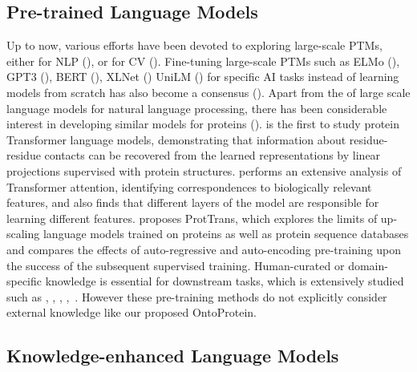 \subsection{Pre-trained Language Models}
Up to now, various efforts have been devoted to exploring large-scale PTMs, either for NLP (\cite{DBLP:conf/naacl/PetersNIGCLZ18,DBLP:conf/naacl/DevlinCLT19}), or for CV (\cite{DBLP:conf/emnlp/TanB19}).
Fine-tuning large-scale PTMs such as ELMo (\cite{DBLP:conf/naacl/PetersNIGCLZ18}), GPT3 (\cite{DBLP:conf/nips/BrownMRSKDNSSAA20}), BERT (\cite{DBLP:conf/naacl/DevlinCLT19}), XLNet (\cite{DBLP:conf/nips/YangDYCSL19}) UniLM (\cite{DBLP:conf/nips/00040WWLWGZH19}) for specific AI tasks instead of learning models from scratch has also become a consensus (\cite{DBLP:journals/corr/abs-2106-07139}). 
Apart from the of large scale language models for natural language processing, there has been considerable interest in developing similar models for proteins (\cite{DBLP:journals/corr/abs-2108-07435,DBLP:journals/pnas/RivesMSGLLGOZMF21}).
\cite{DBLP:conf/icml/RaoLVMCASR21} is the first to study protein Transformer language models, demonstrating that information about residue-residue contacts can be recovered from the learned representations by linear projections supervised with protein structures. 
\cite{DBLP:conf/iclr/VigMVXSR21} performs an extensive analysis of Transformer attention, identifying correspondences to biologically relevant features, and also finds that different layers of the model are responsible for learning different features. 
\cite{DBLP:journals/corr/abs-2007-06225} proposes ProtTrans, which explores the limits of up-scaling language models trained on proteins as well as protein sequence databases and compares the effects of auto-regressive and auto-encoding pre-training upon the success of the subsequent supervised training. 
Human-curated or domain-specific knowledge is essential for downstream tasks, {\color{highlight} which is extensively studied such as  \cite{himmelstein2015heterogeneous}, \cite{smaili2018onto2vec}, \cite{smaili2019opa2vec}, \cite{hao2020bio},\, \cite{ioannidis2020drkg} }.  However these pre-training methods do not explicitly consider external knowledge like our proposed OntoProtein. 

\subsection{Knowledge-enhanced Language Models}

